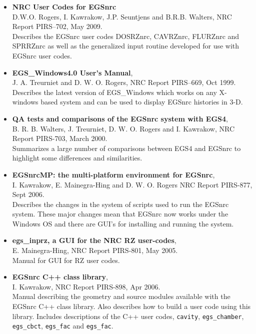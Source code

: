 \begin{itemize}
\item {\bfseries NRC User Codes for EGSnrc}\\ D.W.O. Rogers, I. Kawrakow, J.P.
Seuntjens and B.R.B. Walters, NRC Report PIRS--702, May 2009.\\
Describes the EGSnrc user codes DOSRZnrc, CAVRZnrc, FLURZnrc and
SPRRZnrc as well as the generalized input routine developed for use with 
EGSnrc user codes.

\item {\bfseries EGS\_Windows4.0 User's Manual},\\ J. A.  Treurniet and D.
W. O.  Rogers, NRC Report PIRS--669, Oct 1999.\\
Describes the latest version of  EGS\_Windows which works on any X-windows
based system and can be used to display EGSnrc histories in 3-D.\\


\item {\bfseries  QA tests and comparisons of the EGSnrc system
with EGS4},\\ B. R. B. Walters, J. Treurniet, D. W. O. Rogers
               and I. Kawrakow, NRC Report PIRS-703, March 2000.\\
Summarizes a large number of comparisons between EGS4 and EGSnrc to
highlight some differences and similarities.\\


\item {\bfseries  EGSnrcMP: the multi-platform environment for EGSnrc}, \\
I. Kawrakow, E. Mainegra-Hing and D. W. O. Rogers
           NRC Report PIRS-877, Sept 2006.\\
Describes the changes in the system of scripts used to run the EGSnrc
system. These major changes mean that EGSnrc now works under the Windows OS
and there are GUI's for installing and running the system.\\


\item {\bfseries egs\_inprz, a GUI for the NRC RZ user-codes}, \\
E. Mainegra-Hing, NRC Report PIRS-801, May 2005.\\
Manual for GUI for RZ user codes.\\


\item {\bfseries EGSnrc C++ class library},\\
I. Kawrakow, NRC Report PIRS-898, Apr 2006.\\
Manual describing the geometry and source modules available with the
EGSnrc C++ class library.  Also describes how to build a user code using
this library.  Includes descriptions of the C++ user codes, {\tt cavity},
{\tt egs\_chamber}, {\tt egs\_cbct}, {\tt egs\_fac} and {\tt egs\_fac}.\\

\end{itemize}


